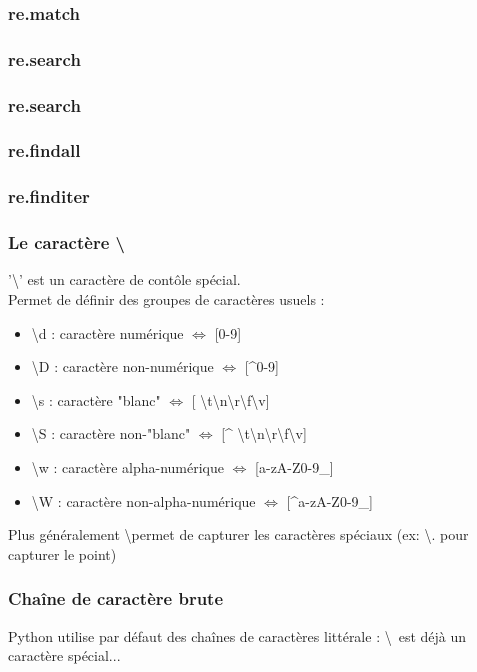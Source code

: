 \begin{frame}
  \frametitle{re.match}
\end{frame}

\begin{frame}
  \frametitle{re.search}
\end{frame}

\begin{frame}
  \frametitle{re.search}
\end{frame}

\begin{frame}
  \frametitle{re.findall}
\end{frame}

\begin{frame}
  \frametitle{re.finditer}
\end{frame}

\begin{frame}
  \frametitle{Le caractère \textbackslash}
  '\textbackslash' est un caractère de contôle spécial. \\
  Permet de définir des groupes de caractères usuels :
  \begin{itemize}
  \item \textbackslash d : caractère numérique $\iff$ {[0-9]}
  \item \textbackslash D : caractère non-numérique $\iff$ {[\^{}0-9]}
  \item \textbackslash s : caractère "blanc" $\iff$ {[ \textbackslash t\textbackslash n\textbackslash r\textbackslash f\textbackslash v]}
  \item \textbackslash S : caractère non-"blanc" $\iff$ {[\^{} \textbackslash t\textbackslash n\textbackslash r\textbackslash f\textbackslash v]}
  \item \textbackslash w : caractère alpha-numérique $\iff$ {[a-zA-Z0-9\_]}
  \item \textbackslash W : caractère non-alpha-numérique $\iff$ {[\^{}a-zA-Z0-9\_]}
  \end{itemize}
  Plus généralement \textbackslash permet de capturer les caractères spéciaux (ex: \textbackslash . pour capturer le point)
\end{frame}

\begin{frame}
  \frametitle{Chaîne de caractère brute}
  Python utilise par défaut des chaînes de caractères littérale : \textbackslash est déjà un caractère spécial...
\end{frame}

